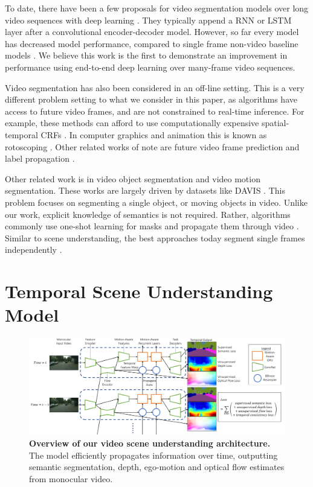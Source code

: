 To date, there have been a few proposals for video segmentation models over long video sequences with deep learning \cite{patraucean2015spatio,valipour2017recurrent}. They typically append a RNN or LSTM layer after a convolutional encoder-decoder model. However, so far every model has decreased model performance, compared to single frame non-video baseline models \cite{patraucean2015spatio,valipour2017recurrent}. We believe this work is the first to demonstrate an improvement in performance using end-to-end deep learning over many-frame video sequences.

Video segmentation has also been considered in an off-line setting. This is a very different problem setting to what we consider in this paper, as algorithms have access to future video frames, and are not constrained to real-time inference. For example, these methods can afford to use computationally expensive spatial-temporal CRFs \cite{kundu2016feature}. In computer graphics and animation this is known as rotoscoping \cite{miksik2017roam}. Other related works of note are future video frame prediction \cite{luc2017predicting} and label propagation \cite{budvytis2010label}.

Other related work is in video object segmentation and video motion segmentation. These works are largely driven by datasets like DAVIS \cite{Perazzi2016}. This problem focuses on segmenting a single object, or moving objects \cite{tsai2016video,tokmakov2017learning,vertens2017smsnet} in video. Unlike our work, explicit knowledge of semantics is not required. Rather, algorithms commonly use one-shot learning for masks and propagate them through video \cite{voigtlaender17BMVC}. Similar to scene understanding, the best approaches today segment single frames independently \cite{caelles2017one,khoreva2016learning}.

\section{Temporal Scene Understanding Model}
\label{sec:video_model}

\begin{figure}[!t]
\begin{center}
\includegraphics[width=\linewidth]{temporal_model.pdf}
\end{center}
\vspace{-5mm}
   \caption[Video scene understanding architecture.]{\textbf{Overview of our video scene understanding architecture.} The model efficiently propagates information over time, outputting semantic segmentation, depth, ego-motion and optical flow estimates from monocular video.}
\label{fig:arch}
\vspace{-2mm}
\end{figure}

